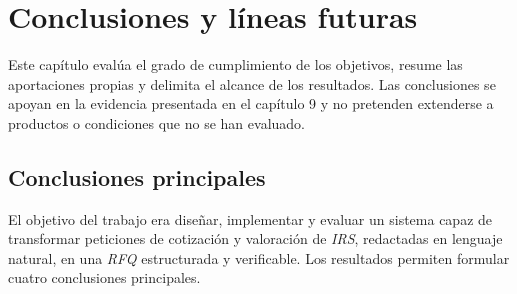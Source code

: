 \chapter{Conclusiones y líneas futuras}
\label{cap:conclusiones}

Este capítulo evalúa el grado de cumplimiento de los objetivos, resume las aportaciones propias y delimita el alcance de los resultados. Las conclusiones se apoyan en la evidencia presentada en el capítulo 9 y no pretenden extenderse a productos o condiciones que no se han evaluado.

\section{Conclusiones principales}
\label{sec:conclusiones_principales}

El objetivo del trabajo era diseñar, implementar y evaluar un sistema capaz de transformar peticiones de cotización y valoración de \textit{IRS}, redactadas en lenguaje natural, en una \textit{RFQ} estructurada y verificable. Los resultados permiten formular cuatro conclusiones principales.


